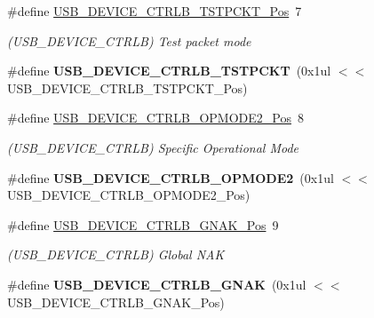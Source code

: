 \begin{DoxyCompactItemize}
\item 
\hypertarget{group___s_a_m_l21___u_s_b_ga44e6b103fc23a7a858b5d6b5db472147}{}\#define \hyperlink{group___s_a_m_l21___u_s_b_ga44e6b103fc23a7a858b5d6b5db472147}{U\+S\+B\+\_\+\+D\+E\+V\+I\+C\+E\+\_\+\+C\+T\+R\+L\+B\+\_\+\+T\+S\+T\+P\+C\+K\+T\+\_\+\+Pos}~7\label{group___s_a_m_l21___u_s_b_ga44e6b103fc23a7a858b5d6b5db472147}

\begin{DoxyCompactList}\small\item\em (U\+S\+B\+\_\+\+D\+E\+V\+I\+C\+E\+\_\+\+C\+T\+R\+L\+B) Test packet mode \end{DoxyCompactList}\item 
\hypertarget{group___s_a_m_l21___u_s_b_gad25be157d8bb798acb96eac09a8f8876}{}\#define {\bfseries U\+S\+B\+\_\+\+D\+E\+V\+I\+C\+E\+\_\+\+C\+T\+R\+L\+B\+\_\+\+T\+S\+T\+P\+C\+K\+T}~(0x1ul $<$$<$ U\+S\+B\+\_\+\+D\+E\+V\+I\+C\+E\+\_\+\+C\+T\+R\+L\+B\+\_\+\+T\+S\+T\+P\+C\+K\+T\+\_\+\+Pos)\label{group___s_a_m_l21___u_s_b_gad25be157d8bb798acb96eac09a8f8876}

\item 
\hypertarget{group___s_a_m_l21___u_s_b_ga11d10c65b87c4d2cbb942f88b544fe6c}{}\#define \hyperlink{group___s_a_m_l21___u_s_b_ga11d10c65b87c4d2cbb942f88b544fe6c}{U\+S\+B\+\_\+\+D\+E\+V\+I\+C\+E\+\_\+\+C\+T\+R\+L\+B\+\_\+\+O\+P\+M\+O\+D\+E2\+\_\+\+Pos}~8\label{group___s_a_m_l21___u_s_b_ga11d10c65b87c4d2cbb942f88b544fe6c}

\begin{DoxyCompactList}\small\item\em (U\+S\+B\+\_\+\+D\+E\+V\+I\+C\+E\+\_\+\+C\+T\+R\+L\+B) Specific Operational Mode \end{DoxyCompactList}\item 
\hypertarget{group___s_a_m_l21___u_s_b_ga7f75914b68600a87003a7109fad16f6f}{}\#define {\bfseries U\+S\+B\+\_\+\+D\+E\+V\+I\+C\+E\+\_\+\+C\+T\+R\+L\+B\+\_\+\+O\+P\+M\+O\+D\+E2}~(0x1ul $<$$<$ U\+S\+B\+\_\+\+D\+E\+V\+I\+C\+E\+\_\+\+C\+T\+R\+L\+B\+\_\+\+O\+P\+M\+O\+D\+E2\+\_\+\+Pos)\label{group___s_a_m_l21___u_s_b_ga7f75914b68600a87003a7109fad16f6f}

\item 
\hypertarget{group___s_a_m_l21___u_s_b_ga0ed47cb7457c19bd0a460ec4f89f1d15}{}\#define \hyperlink{group___s_a_m_l21___u_s_b_ga0ed47cb7457c19bd0a460ec4f89f1d15}{U\+S\+B\+\_\+\+D\+E\+V\+I\+C\+E\+\_\+\+C\+T\+R\+L\+B\+\_\+\+G\+N\+A\+K\+\_\+\+Pos}~9\label{group___s_a_m_l21___u_s_b_ga0ed47cb7457c19bd0a460ec4f89f1d15}

\begin{DoxyCompactList}\small\item\em (U\+S\+B\+\_\+\+D\+E\+V\+I\+C\+E\+\_\+\+C\+T\+R\+L\+B) Global N\+A\+K \end{DoxyCompactList}\item 
\hypertarget{group___s_a_m_l21___u_s_b_gaf178d923d51212654a8a358a2bc7ddf5}{}\#define {\bfseries U\+S\+B\+\_\+\+D\+E\+V\+I\+C\+E\+\_\+\+C\+T\+R\+L\+B\+\_\+\+G\+N\+A\+K}~(0x1ul $<$$<$ U\+S\+B\+\_\+\+D\+E\+V\+I\+C\+E\+\_\+\+C\+T\+R\+L\+B\+\_\+\+G\+N\+A\+K\+\_\+\+Pos)\label{group___s_a_m_l21___u_s_b_gaf178d923d51212654a8a358a2bc7ddf5}


\end{DoxyCompactItemize}
